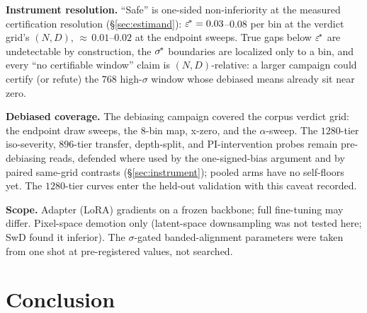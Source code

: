 \textbf{Instrument resolution.} ``Safe'' is one-sided non-inferiority at
the measured certification resolution (\S\ref{sec:estimand}):
$\varepsilon^{\!*} = 0.03$--$0.08$ per bin at the verdict grid's $(N, D)$,
${\approx}\,0.01$--$0.02$ at the endpoint sweeps. True gaps below
$\varepsilon^{\!*}$ are undetectable by construction, the $\sigma^{\!*}$ boundaries
are localized only to a bin, and every ``no certifiable window'' claim
is $(N, D)$-relative: a larger campaign could certify (or refute) the
$768$ high-$\sigma$ window whose debiased means already sit near zero.

\textbf{Debiased coverage.} The debiasing campaign covered the corpus
verdict grid: the endpoint draw sweeps, the $8$-bin map, x-zero, and the
$\alpha$-sweep. The $1280$-tier iso-severity, $896$-tier transfer,
depth-split, and PI-intervention probes remain pre-debiasing reads,
defended where used by the one-signed-bias argument and by paired
same-grid contrasts (\S\ref{sec:instrument}); pooled arms have no
self-floors yet. The $1280$-tier curves enter the held-out validation
with this caveat recorded.

\textbf{Scope.} Adapter (LoRA) gradients on a frozen backbone; full
fine-tuning may differ. Pixel-space demotion only (latent-space
downsampling was not tested here; SwD found it inferior). The
$\sigma$-gated banded-alignment parameters were taken from one shot at
pre-registered values, not searched.

\section{Conclusion}
\label{sec:conclusion}

